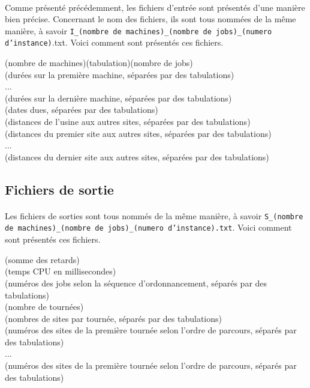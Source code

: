 	\paragraph{}
	Comme présenté précédemment, les fichiers d'entrée sont présentés d'une manière bien précise. Concernant le nom des fichiers, ils sont tous nommées de la même manière, à savoir \texttt{I\_(nombre de machines)\_(nombre de jobs)\_(numero d'instance)}.txt. Voici comment sont présentés ces fichiers. 
	\begin{flushleft}
	(nombre de machines)(tabulation)(nombre de jobs) \\
	(durées sur la première machine, séparées par des tabulations) \\
	... \\
	(durées sur la dernière machine, séparées par des tabulations) \\
	(dates dues, séparées par des tabulations) \\
	(distances de l'usine aux autres sites, séparées par des tabulations) \\
	(distances du premier site aux autres sites, séparées par des tabulations) \\
	... \\
	(distances du dernier site aux autres sites, séparées par des tabulations)
	\end{flushleft}
%

	\subsection{Fichiers de sortie}
	
	\paragraph{}
	Les fichiers de sorties sont tous nommés de la même manière, à savoir \texttt{S\_(nombre de machines)\_(nombre de jobs)\_(numero d'instance).txt}. Voici comment sont présentés ces fichiers. 
	\begin{flushleft}
	(somme des retards) \\
	(temps CPU en millisecondes) \\
	(numéros des jobs selon la séquence d'ordonnancement, séparés par des tabulations) \\
	(nombre de tournées) \\
	(nombres de sites par tournée, séparés par des tabulations) \\
	(numéros des sites de la première tournée selon l'ordre de parcours, séparés par des tabulations) \\
	... \\
	(numéros des sites de la première tournée selon l'ordre de parcours, séparés par des tabulations) \\
	\end{flushleft}
%

